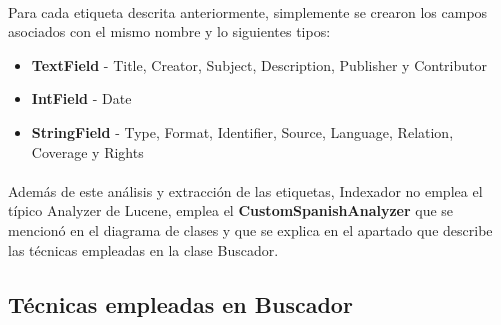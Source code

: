 \documentclass[a4paper]{article}
\begin{document}
\paragraph{}Para cada etiqueta descrita anteriormente, simplemente se crearon los campos asociados con el mismo nombre y lo siguientes tipos:
\begin{itemize}
	\item \textbf{TextField} - Title, Creator, Subject, Description, Publisher y Contributor
	\item \textbf{IntField} - Date
	\item \textbf{StringField} - Type, Format, Identifier, Source, Language, Relation, Coverage y Rights
\end{itemize}
\paragraph{}Además de este análisis y extracción de las etiquetas, Indexador no emplea el típico Analyzer de Lucene, emplea el \textbf{CustomSpanishAnalyzer} que se mencionó en el diagrama de clases y que se explica en el apartado que describe las técnicas empleadas en la clase Buscador.
\\
\newpage
\subsection{Técnicas empleadas en Buscador}
\end{document}

